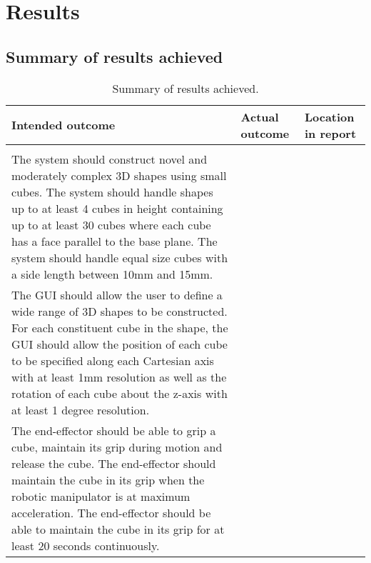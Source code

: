 
\section{Results}

\subsection{Summary of results achieved}

\begin{table}[h]
	\renewcommand{\arraystretch}{1.3}
	\centering
	\begin{tabular}{|>{\raggedright}m{6.5cm}|>{\raggedright}m{5cm}|>{\raggedright\arraybackslash}m{3cm}|}
		\hline
		\textbf{Intended outcome} & \textbf{Actual outcome} & \textbf{Location in report} \\
		\hline
		\multicolumn{3}{|l|}{\textbf{Core mission requirements and specifications}} \\
		\hline
		The system should construct novel and moderately complex 3D shapes using small cubes. The system should handle shapes up to at least 4 cubes in height containing up to at least 30 cubes where each cube has a face parallel to the base plane. The system should handle equal size cubes with a side length between 10mm and 15mm. & & \\
		\hline
		The GUI should allow the user to define a wide range of 3D shapes to be constructed. For each constituent cube in the shape, the GUI should allow the position of each cube to be specified along each Cartesian axis with at least 1mm resolution as well as the rotation of each cube about the z-axis with at least 1 degree resolution. & & \\
		\hline
		The end-effector should be able to grip a cube, maintain its grip during motion and release the cube. The end-effector should maintain the cube in its grip when the robotic manipulator is at maximum acceleration. The end-effector should be able to maintain the cube in its grip for at least 20 seconds continuously. &  & \\
		\hline
	\end{tabular}
	\caption{\label{tab:results_summary_p1}Summary of results achieved.}
\end{table}

